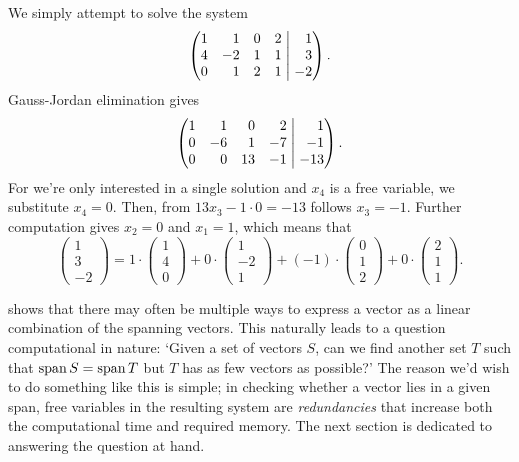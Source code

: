 \begin{probsol}
 We simply attempt to solve the system
 \[
  \left(
   \begin{matrix*}[r]
    1 & 1 & 0 & 2\\
    4 & -2 & 1 & 1\\
    0 & 1 & 2 & 1
   \end{matrix*}
   \hspace{1mm}
  \right|
  \left.
   \begin{matrix*}[r]
    1\\
    3\\
    -2
   \end{matrix*}
  \right).
 \]
 Gauss-Jordan elimination gives
 \[
  \left(
   \begin{matrix*}[r]
    1 & 1 & 0 & 2\\
    0 & -6 & 1 & -7\\
    0 & 0 & 13 & -1
   \end{matrix*}
   \hspace{1mm}
  \right|
  \left.
   \begin{matrix*}[r]
    1\\
    -1\\
    -13
   \end{matrix*}
  \right).
 \]
 For we're only interested in a single solution and $x_4$ is a free variable, we
 substitute $x_4 = 0$. Then, from $13x_3 - 1 \cdot 0 = -13$ follows $x_3 = -1$.
 Further computation gives $x_2 = 0$ and $x_1 = 1$, which means that
 \[
  \begin{pmatrix}
   1\\
   3\\
   -2
  \end{pmatrix}
  = 1 \cdot 
  \begin{pmatrix}
   1\\
   4\\
   0
  \end{pmatrix}
  + 0 \cdot 
  \begin{pmatrix}
   1\\
   -2\\
   1
  \end{pmatrix}
  + (-1) \cdot 
  \begin{pmatrix}
   0\\
   1\\
   2
  \end{pmatrix}
  + 0 \cdot 
  \begin{pmatrix}
   2\\
   1\\
   1
  \end{pmatrix}.
 \]
\end{probsol}

 shows that there may often be multiple
ways to express a vector as a linear combination of the spanning vectors. This
naturally leads to a question computational in nature: `Given a set of vectors
$S$, can we find another set $T$ such that $\operatorname{span} S = \operatorname{span} T$ but $T$ has as few
vectors as possible?' The reason we'd wish to do something like this is simple;
in checking whether a vector lies in a given span, free variables in the
resulting system are \emph{redundancies} that increase both the computational
time and required memory. The next section is dedicated to answering the
question at hand.
